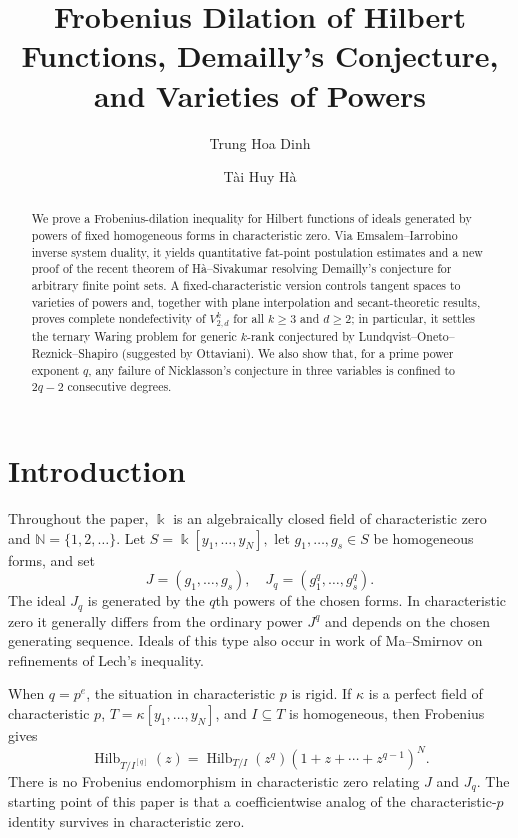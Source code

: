 \documentclass[11pt]{amsart}
\title{Frobenius Dilation of Hilbert Functions, Demailly's Conjecture, and Varieties of Powers}
\author{Trung Hoa Dinh}
\author{T\`ai Huy H\`a}
\theoremstyle{remark}
\newcommand{\kk}{\Bbbk}
\newcommand{\NN}{\mathbb N}
\newcommand{\Hilb}{\operatorname{Hilb}}
\begin{document}
\begin{abstract}
We prove a Frobenius-dilation inequality for Hilbert functions of ideals generated by powers of fixed homogeneous forms in characteristic zero. Via Emsalem--Iarrobino inverse system duality, it yields quantitative fat-point postulation estimates and a new proof of the recent theorem of H\`a--Sivakumar resolving Demailly's conjecture for arbitrary finite point sets. A fixed-characteristic version controls tangent spaces to varieties of powers and, together with plane interpolation and secant-theoretic results, proves complete nondefectivity of $V^k_{2,d}$ for all $k\ge3$ and $d\ge2$; in particular, it settles the ternary Waring problem for generic $k$-rank conjectured by Lundqvist--Oneto--Reznick--Shapiro (suggested by Ottaviani). We also show that, for a prime power exponent $q$, any failure of Nicklasson's conjecture in three variables is confined to $2q-2$ consecutive degrees.
\end{abstract}

\maketitle


\section{Introduction}\label{sec:intro}

Throughout the paper, $\kk$ is an algebraically closed field of characteristic zero and $\NN=\{1,2,\ldots\}$. Let
$
S=\kk[y_1,\ldots,y_N],
$
let $g_1,\ldots,g_s\in S$ be homogeneous forms, and set
$$
J=(g_1,\ldots,g_s),
\quad
J_q=(g_1^q,\ldots,g_s^q).
$$
The ideal $J_q$ is generated by the $q$th powers of the chosen forms. In characteristic zero it generally differs from the ordinary power $J^q$ and depends on the chosen generating sequence. Ideals of this type also occur in work of Ma--Smirnov \cite{MaSmirnov} on refinements of Lech's inequality.

When $q=p^e$, the situation in characteristic $p$ is rigid. If $\kappa$ is a perfect field of characteristic $p$, $T=\kappa[y_1,\ldots,y_N]$, and $I\subseteq T$ is homogeneous, then Frobenius gives
$$
\Hilb_{T/I^{[q]}}(z)
=
\Hilb_{T/I}(z^q)(1+z+\cdots+z^{q-1})^N.
$$
There is no Frobenius endomorphism in characteristic zero relating $J$ and $J_q$. The starting point of this paper is that a coefficientwise analog of the characteristic-$p$ identity survives in characteristic zero.
\end{document}
